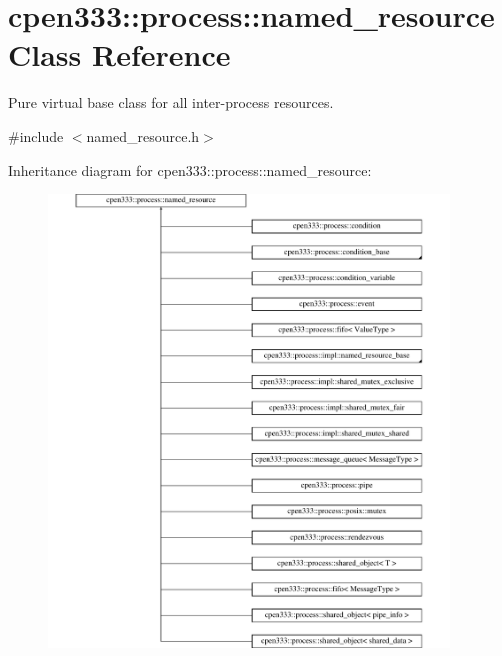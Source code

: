 \hypertarget{classcpen333_1_1process_1_1named__resource}{}\section{cpen333\+:\+:process\+:\+:named\+\_\+resource Class Reference}
\label{classcpen333_1_1process_1_1named__resource}


Pure virtual base class for all inter-\/process resources.  




{\ttfamily \#include $<$named\+\_\+resource.\+h$>$}

Inheritance diagram for cpen333\+:\+:process\+:\+:named\+\_\+resource\+:\begin{figure}[H]
\begin{center}
\leavevmode
\includegraphics[height=12.000000cm]{classcpen333_1_1process_1_1named__resource}
\end{center}
\end{figure}
